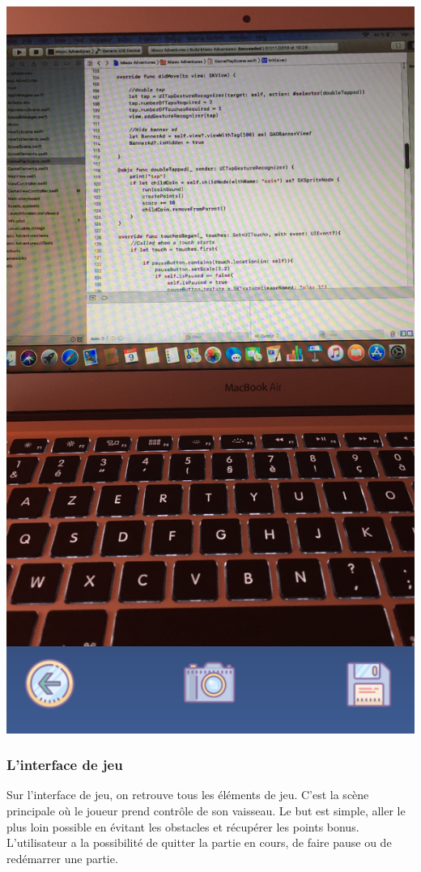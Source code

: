 \documentclass{article}
\begin{document}
\begin{center}
    \includegraphics[scale = 0.18]{images/iOS_2.PNG}
\end{center}

\newpage
\subsubsection{L'interface de jeu}
Sur l'interface de jeu, on retrouve tous les éléments de jeu. C'est la scène principale où le joueur prend contrôle de son vaisseau. Le but est simple, aller le plus loin possible en évitant les obstacles et récupérer les points bonus. L'utilisateur a la possibilité de quitter la partie en cours, de faire pause ou de redémarrer une partie. 
\end{document}
